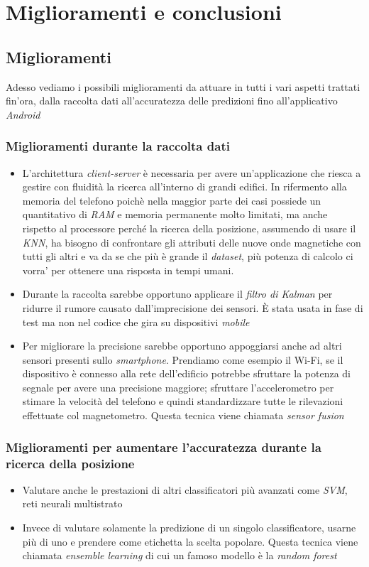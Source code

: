 \chapter{Miglioramenti e conclusioni}
\section{Miglioramenti}
Adesso vediamo i possibili miglioramenti da attuare in tutti i vari aspetti trattati fin'ora, dalla raccolta dati all'accuratezza delle predizioni fino all'applicativo \textit{Android}
\subsection{Miglioramenti durante la raccolta dati}
\begin{itemize}
	\item L'architettura \textit{client-server} \`e necessaria per avere un'applicazione che riesca a gestire con fluidit\`a la ricerca all'interno di grandi edifici. In rifermento alla memoria del telefono poich\`e nella maggior parte dei casi possiede un quantitativo di \textit{RAM} e memoria permanente molto limitati, ma anche rispetto al processore perch\'e la ricerca della posizione, assumendo di usare il \textit{KNN}, ha bisogno di confrontare gli attributi delle nuove onde magnetiche con tutti gli altri e va da se che pi\`u  \`e grande il \textit{dataset}, pi\`u  potenza di calcolo ci vorra' per ottenere una risposta in tempi umani.
	\item Durante la raccolta sarebbe opportuno applicare il \textit{filtro di Kalman} per ridurre il rumore causato dall'imprecisione dei sensori. \`E stata usata in fase di test ma non nel codice che gira su dispositivi \textit{mobile}
	\item Per migliorare la precisione sarebbe opportuno appoggiarsi anche ad altri sensori presenti sullo \textit{smartphone}. Prendiamo come esempio il Wi-Fi, se il dispositivo \`e connesso alla rete dell'edificio potrebbe sfruttare la potenza di segnale per avere una precisione maggiore; sfruttare l'accelerometro per stimare la velocit\`a del telefono e quindi standardizzare tutte le rilevazioni effettuate col magnetometro. Questa tecnica viene chiamata \textit{sensor fusion}\cite{shala2011indoor}
\end{itemize}
\subsection{Miglioramenti per aumentare l'accuratezza durante la ricerca della posizione}
\begin{itemize}
	\item Valutare anche le prestazioni di altri classificatori pi\`u avanzati come \textit{SVM}, reti neurali multistrato 
	\item Invece di valutare solamente la predizione di un singolo classificatore, usarne pi\`u di uno e prendere come etichetta la scelta popolare. Questa tecnica viene chiamata \textit{ensemble learning} di cui un famoso modello \`e la \textit{random forest}
\end{itemize}
